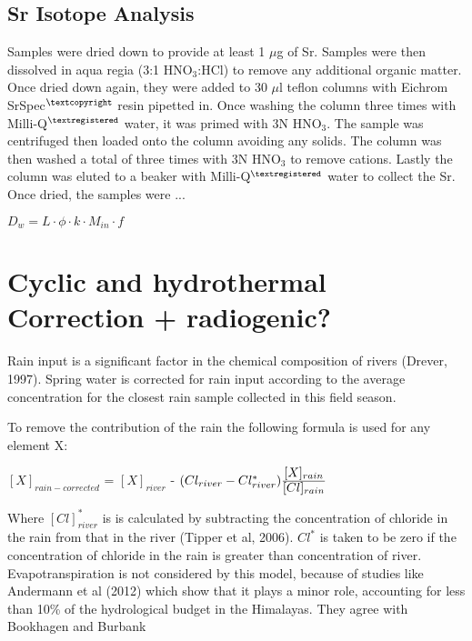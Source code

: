 
\subsection{Sr Isotope Analysis}

Samples were dried down to provide at least 1 $\mu$g of Sr. Samples were then dissolved in aqua regia (3:1 HNO$_3$:HCl) to remove any additional organic matter. Once dried down again, they were added to 30 $\mu$l teflon columns with Eichrom SrSpec$^{\textcopyright}$ resin pipetted in. Once washing the column three times with Milli-Q$^{\textregistered}$ water, it was primed with 3N HNO$_3$. The sample was centrifuged then loaded onto the column avoiding any solids. The column was then washed a total of three times with 3N HNO$_3$ to remove cations. Lastly the column was eluted to a beaker with Milli-Q$^{\textregistered}$ water to collect the Sr. Once dried, the samples were ...



$D_w = L \cdot \phi \cdot k \cdot M_{in} \cdot f$






\section{Cyclic and hydrothermal Correction + radiogenic?}

Rain input is a significant factor in the chemical composition of rivers (Drever, 1997).
Spring water is corrected for rain input according to the average concentration for the closest 
rain sample collected in this field season. %

\bsk

To remove the contribution of the rain the following formula is used for any element X:

\begin{center}
{\Large
$[X]_{rain-corrected}$  = $[X]_{river}$ - $(Cl_{river} - Cl^*_{river})\ddfrac{[X]_{rain}}{[Cl]_{rain}}$}

\end{center}

Where $[Cl]^*_{river}$ is is calculated by subtracting the concentration of chloride in the rain from that in the river (Tipper et al, 2006).
$Cl^{*}$ is taken to be zero if the concentration of chloride in the rain is greater than concentration of river. Evapotranspiration is not considered by this model, because of
studies like Andermann et al (2012) which show that it plays a minor role, accounting for less than 10\% of the hydrological budget in the Himalayas.
They agree with Bookhagen and Burbank


